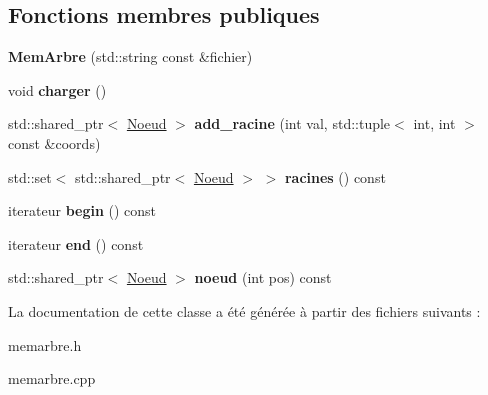 \subsection*{Fonctions membres publiques}
\begin{DoxyCompactItemize}
\item 
{\bfseries Mem\+Arbre} (std\+::string const \&fichier)\hypertarget{classMemArbre_ac5190591ba7c14a65a0c4dac3b79dfd7}{}\label{classMemArbre_ac5190591ba7c14a65a0c4dac3b79dfd7}

\item 
void {\bfseries charger} ()\hypertarget{classMemArbre_aed29ba0b60d2b1000df67bcc8c20017f}{}\label{classMemArbre_aed29ba0b60d2b1000df67bcc8c20017f}

\item 
std\+::shared\+\_\+ptr$<$ \hyperlink{classMemArbre_1_1Noeud}{Noeud} $>$ {\bfseries add\+\_\+racine} (int val, std\+::tuple$<$ int, int $>$ const \&coords)\hypertarget{classMemArbre_ac18d57ffee484bf225255213ba5b0cbe}{}\label{classMemArbre_ac18d57ffee484bf225255213ba5b0cbe}

\item 
std\+::set$<$ std\+::shared\+\_\+ptr$<$ \hyperlink{classMemArbre_1_1Noeud}{Noeud} $>$ $>$ {\bfseries racines} () const \hypertarget{classMemArbre_a5e84dc402d7e740f853cef4107f7cce4}{}\label{classMemArbre_a5e84dc402d7e740f853cef4107f7cce4}

\item 
iterateur {\bfseries begin} () const \hypertarget{classMemArbre_afd69fc6c9f2fe86ac9dea7e4ca4223e0}{}\label{classMemArbre_afd69fc6c9f2fe86ac9dea7e4ca4223e0}

\item 
iterateur {\bfseries end} () const \hypertarget{classMemArbre_a87f7bbf0ea68be14aa83661585bcf4a8}{}\label{classMemArbre_a87f7bbf0ea68be14aa83661585bcf4a8}

\item 
std\+::shared\+\_\+ptr$<$ \hyperlink{classMemArbre_1_1Noeud}{Noeud} $>$ {\bfseries noeud} (int pos) const \hypertarget{classMemArbre_a474515fbd83097859ff121dd0cc4a57c}{}\label{classMemArbre_a474515fbd83097859ff121dd0cc4a57c}

\end{DoxyCompactItemize}


La documentation de cette classe a été générée à partir des fichiers suivants \+:\begin{DoxyCompactItemize}
\item 
memarbre.\+h\item 
memarbre.\+cpp\end{DoxyCompactItemize}
